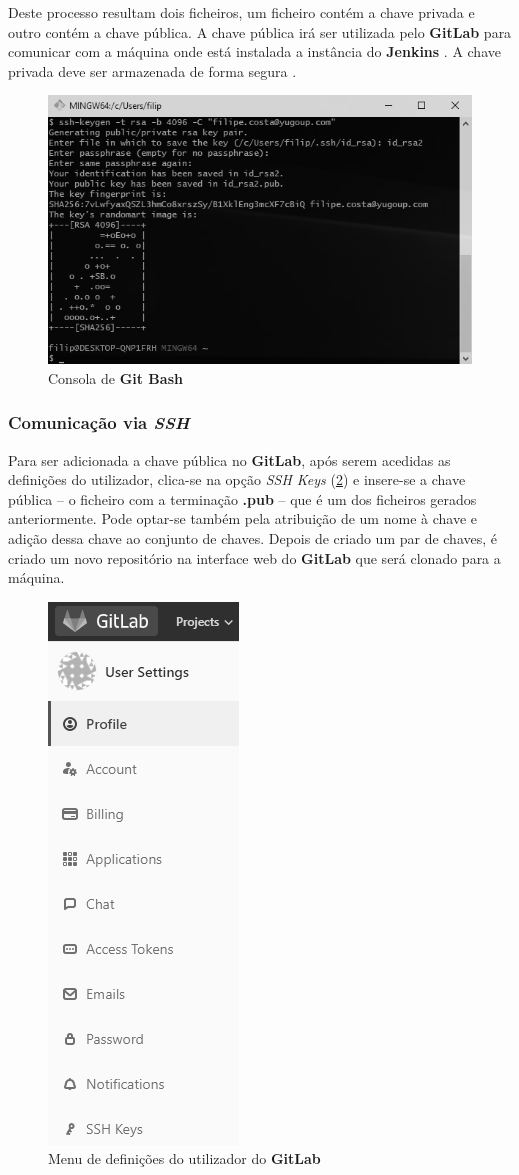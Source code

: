 \hspace{1cm}Deste processo resultam dois ficheiros, um ficheiro contém a chave privada e outro contém a chave pública. A chave pública irá ser utilizada pelo \textbf{GitLab} para comunicar com a máquina onde está instalada a instância do \textbf{Jenkins} . A chave privada deve ser armazenada de forma segura \cite{gitssh}.

\begin{figure}[hbt!]
\centering
\includegraphics[width=0.6\linewidth]{Cap5/SSHKeyPairGeneration.png}
\caption{Consola de \textbf{Git Bash}}
\label{Fig:Fig10}
\end{figure}

\subsubsection{Comunicação via \textit{SSH}}

\hspace{1cm}Para ser adicionada a chave pública no \textbf{GitLab}, após serem acedidas as definições do utilizador, clica-se na opção \textit{SSH Keys} (\ref{Fig:Fig11}) e insere-se a chave pública -- o ficheiro com a terminação \textbf{.pub} -- que é um dos ficheiros gerados anteriormente. Pode optar-se também pela atribuição de um nome à chave e adição dessa chave ao conjunto de chaves. Depois de criado um par de chaves, é criado um novo repositório na interface web do \textbf{GitLab} que será clonado para a máquina.

\begin{figure}[hbt!]
\centering
\includegraphics[width=0.2\linewidth]{Cap5/GitLabSettingsNavbar.png}
\caption{Menu de definições do utilizador do \textbf{GitLab}}
\label{Fig:Fig11}
\end{figure}

